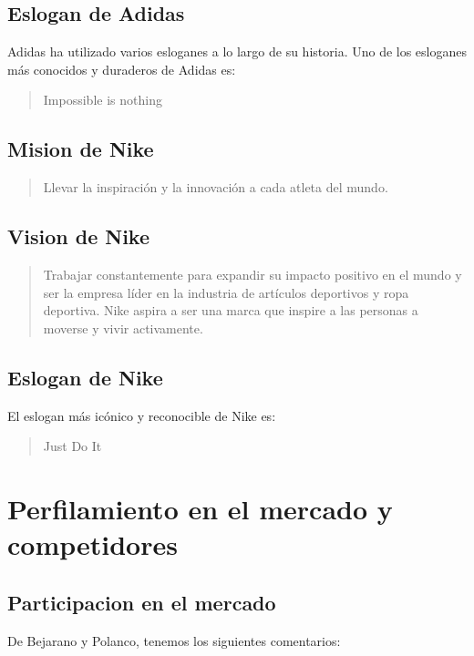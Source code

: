 \documentclass[a4paper,12pt]{article}
\begin{document}
\subsection{Eslogan de Adidas}
Adidas ha utilizado varios esloganes a lo largo de su historia. Uno de los esloganes más conocidos y duraderos de Adidas es:
\begin{quotation}
	Impossible is nothing
\end{quotation}


\subsection{Mision de Nike}
\begin{quotation}
	Llevar la inspiración y la innovación a cada atleta del mundo.
\end{quotation}
\subsection{Vision de Nike}
\begin{quotation}
	Trabajar constantemente para expandir su impacto positivo en el mundo y ser la empresa líder en la industria de artículos deportivos y ropa deportiva. Nike aspira a ser una marca que inspire a las personas a moverse y vivir activamente.
\end{quotation}
\subsection{Eslogan de Nike}
El eslogan más icónico y reconocible de Nike es: 
\begin{quotation}
	Just Do It
\end{quotation}


\clearpage
\section{Perfilamiento en el mercado y competidores}

\subsection{Participacion en el mercado}

De Bejarano y Polanco, tenemos los siguientes comentarios:
\end{document}
